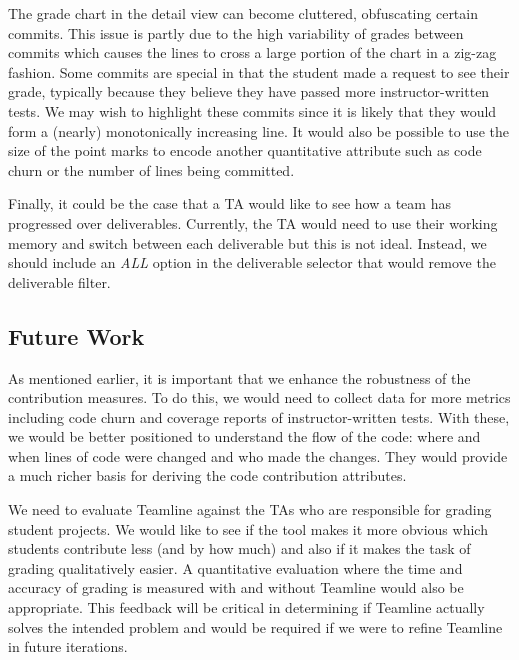 \documentclass[../manifest.tex]{subfiles}
\begin{document}
The grade chart in the detail view can become cluttered, obfuscating certain commits. This issue is partly due to the high variability of grades between commits which causes the lines to cross a large portion of the chart in a zig-zag fashion. Some commits are special in that the student made a request to see their grade, typically because they believe they have passed more instructor-written tests. We may wish to highlight these commits since it is likely that they would form a (nearly) monotonically increasing line. It would also be possible to use the size of the point marks to encode another quantitative attribute such as code churn or the number of lines being committed.


Finally, it could be the case that a TA would like to see how a team has progressed over deliverables. Currently, the TA would need to use their working memory and switch between each deliverable but this is not ideal. Instead, we should include an \textit{ALL} option in the deliverable selector that would remove the deliverable filter.


\subsection{Future Work}
As mentioned earlier, it is important that we enhance the robustness of the contribution measures. To do this, we would need to collect data for more metrics including code churn and coverage reports of instructor-written tests. With these, we would be better positioned to understand the flow of the code: where and when lines of code were changed and who made the changes. They would provide a much richer basis for deriving the code contribution attributes.

We need to evaluate Teamline against the TAs who are responsible for grading student projects. We would like to see if the tool makes it more obvious which students contribute less (and by how much) and also if it makes the task of grading qualitatively easier. A quantitative evaluation where the time and accuracy of grading is measured with and without Teamline would also be appropriate. This feedback will be critical in determining if Teamline actually solves the intended problem and would be required if we were to refine Teamline in future iterations.
\end{document}
